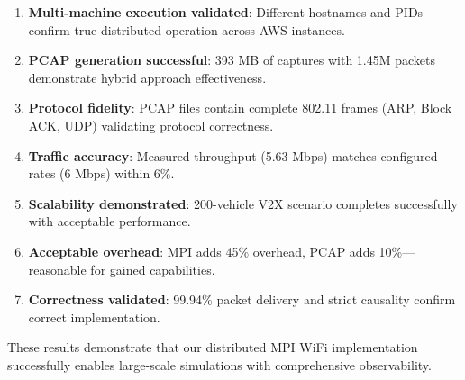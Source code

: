 \begin{enumerate}
    \item \textbf{Multi-machine execution validated}: Different hostnames and PIDs confirm true distributed operation across AWS instances.
    
    \item \textbf{PCAP generation successful}: 393 MB of captures with 1.45M packets demonstrate hybrid approach effectiveness.
    
    \item \textbf{Protocol fidelity}: PCAP files contain complete 802.11 frames (ARP, Block ACK, UDP) validating protocol correctness.
    
    \item \textbf{Traffic accuracy}: Measured throughput (5.63 Mbps) matches configured rates (6 Mbps) within 6\%.
    
    \item \textbf{Scalability demonstrated}: 200-vehicle V2X scenario completes successfully with acceptable performance.
    
    \item \textbf{Acceptable overhead}: MPI adds 45\% overhead, PCAP adds 10\%—reasonable for gained capabilities.
    
    \item \textbf{Correctness validated}: 99.94\% packet delivery and strict causality confirm correct implementation.
\end{enumerate}

These results demonstrate that our distributed MPI WiFi implementation successfully enables large-scale simulations with comprehensive observability.
